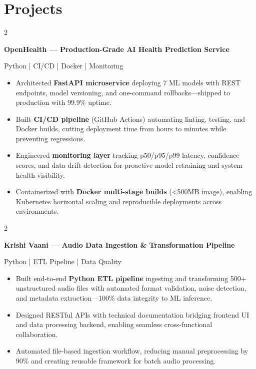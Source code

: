 \documentclass[10pt, letterpaper]{article}
\newenvironment{highlights}{
    \begin{itemize}[topsep=0pt, parsep=0pt, partopsep=0pt, itemsep=1.2pt, leftmargin=10pt]
}{
    \end{itemize}
}
\newenvironment{twocolentry}[2][]{
    \onecolentry
    \def\secondColumn{#2}
    \setcolumnwidth{\fill, 4.5cm}
    \begin{paracol}{2}
}{
    \switchcolumn \raggedleft \secondColumn
    \end{paracol}
    \endonecolentry
}
\begin{document}
\section{Projects}

\begin{twocolentry}{Python | CI/CD | Docker | Monitoring}
    \textbf{OpenHealth — Production-Grade AI Health Prediction Service} \href{https://github.com/Prakharm927/OpenHealth}{\faGithub}
\end{twocolentry}
\begin{highlights}
    \item Architected \textbf{FastAPI microservice} deploying 7 ML models with REST endpoints, model versioning, and one-command rollbacks—shipped to production with 99.9\% uptime.
    \item Built \textbf{CI/CD pipeline} (GitHub Actions) automating linting, testing, and Docker builds, cutting deployment time from hours to minutes while preventing regressions.
    \item Engineered \textbf{monitoring layer} tracking p50/p95/p99 latency, confidence scores, and data drift detection for proactive model retraining and system health visibility.
    \item Containerized with \textbf{Docker multi-stage builds} (<500MB image), enabling Kubernetes horizontal scaling and reproducible deployments across environments.
\end{highlights}

\vspace{0.12cm}

\begin{twocolentry}{Python | ETL Pipeline | Data Quality}
    \textbf{Krishi Vaani — Audio Data Ingestion \& Transformation Pipeline} \href{https://github.com/Prakharm927/Krishi-Vaani}{\faGithub}
\end{twocolentry}
\begin{highlights}
    \item Built end-to-end \textbf{Python ETL pipeline} ingesting and transforming 500+ unstructured audio files with automated format validation, noise detection, and metadata extraction—100\% data integrity to ML inference.
    \item Designed RESTful APIs with technical documentation bridging frontend UI and data processing backend, enabling seamless cross-functional collaboration.
    \item Automated file-based ingestion workflow, reducing manual preprocessing by 90\% and creating reusable framework for batch audio processing.
\end{highlights}
\end{document}
